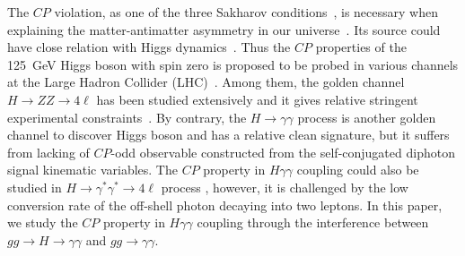 \documentclass[twocolumn,
prd,amssymb,amsmath,preprintnumbers,
floatfix,aps,nofootinbib]{revtex4-1}
\begin{document}
The $CP$ violation, as one of the three Sakharov conditions~\cite{Sakharov:1967dj},
is necessary when explaining the matter-antimatter
 asymmetry in our universe~\cite{Ade:2013zuv}.
Its source could have close relation with Higgs dynamics~\cite{Accomando:2006ga,Morrissey:2012db}.
Thus the $CP$ properties of the 125~GeV Higgs boson with spin zero is proposed to
be probed in various channels at the Large Hadron Collider (LHC)~\cite{Gao:2010qx,Bolognesi:2012mm,Gritsan:2016hjl,Ellis:2013lra,Buckley:2015vsa,Li:2015kxc,Hayreter:2016aex,Hagiwara:2016zqz,Dolan:2014upa,Chen:2014ona,Korchin:2014kha,Chen:2017plj,Bian:2017jpt,Brehmer:2017lrt,Khachatryan:2014kca,Khachatryan:2016tnr,Sirunyan:2017tqd,CMS:2018bwq,Aad:2016nal,Aaboud:2017vzb}.
Among them, the golden channel $H\to ZZ\to 4\ell$ has been studied extensively
and it gives relative stringent experimental constraints~\cite{Khachatryan:2014kca,Sirunyan:2017tqd,CMS:2018bwq,Aaboud:2017vzb}.
By contrary, the $H\to\gamma\gamma$ process
 is another golden channel to discover
Higgs boson and has a relative clean signature, but
it suffers from lacking of $CP$-odd observable constructed from
the self-conjugated diphoton signal kinematic variables.
The $CP$ property in $H\gamma\gamma$ coupling could also be studied in
$H\to\gamma^\ast\gamma^\ast\to 4\ell$ process \cite{Voloshin:2012tv,Bishara:2013vya,Chen:2014gka}, however, it is challenged by the low conversion rate
 of the off-shell photon decaying into two leptons.
In this paper, we study the $CP$ property in $H\gamma\gamma$ coupling
through the interference between $gg\to H \to \gamma\gamma$ and $gg\to \gamma\gamma$.
\end{document}
